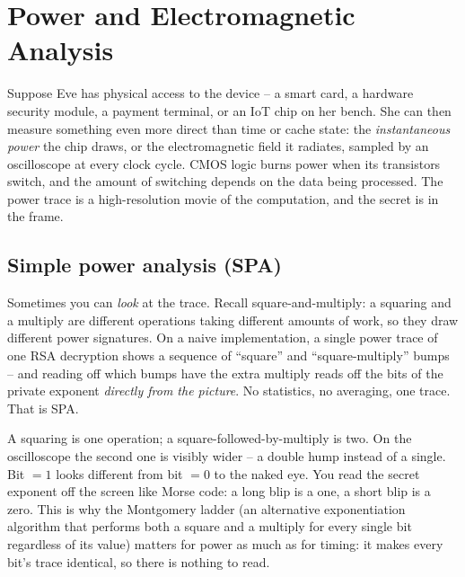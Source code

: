 \section{Power and Electromagnetic Analysis}
\label{ch37:power}

Suppose Eve has physical access to the device -- a smart card, a hardware security module, a payment terminal, or an IoT chip on her bench. She can then measure something even more direct than time or cache state: the \emph{instantaneous power} the chip draws, or the electromagnetic field it radiates, sampled by an oscilloscope at every clock cycle. CMOS logic burns power when its transistors switch, and the amount of switching depends on the data being processed. The power trace is a high-resolution movie of the computation, and the secret is in the frame.

\subsection{Simple power analysis (SPA)}
\label{ch37:spa}

Sometimes you can \emph{look} at the trace. Recall square-and-multiply: a squaring and a multiply are different operations taking different amounts of work, so they draw different power signatures. On a naive implementation, a single power trace of one RSA decryption shows a sequence of ``square'' and ``square-multiply'' bumps -- and reading off which bumps have the extra multiply reads off the bits of the private exponent \emph{directly from the picture}. No statistics, no averaging, one trace. That is SPA.

\begin{intuitionbox}
A squaring is one operation; a square-followed-by-multiply is two. On the oscilloscope the second one is visibly wider -- a double hump instead of a single. Bit $=1$ looks different from bit $=0$ to the naked eye. You read the secret exponent off the screen like Morse code: a long blip is a one, a short blip is a zero. This is why the Montgomery ladder (an alternative exponentiation algorithm that performs both a square and a multiply for every single bit regardless of its value) matters for power as much as for timing: it makes every bit's trace identical, so there is nothing to read.
\end{intuitionbox}

